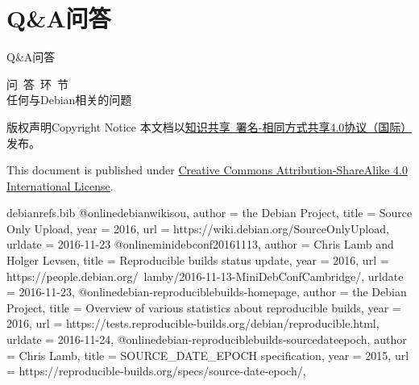 \documentclass[aspectratio=169]{beamer}
\begin{document}

\section{Q\&A问答}

\begin{frame}{Q\&A}{问答}
\begin{center}
{\Large 问~答~环~节}
\\
任何与Debian相关的问题
\end{center}
\end{frame}

\begin{frame}{版权声明}{Copyright Notice}
本文档以\href{https://creativecommons.org/licenses/by-sa/4.0/legalcode}{知识共享~署名-相同方式共享4.0协议（国际）}发布。
\vspace{1em}

This document is published under \href{https://creativecommons.org/licenses/by-sa/4.0/legalcode}{Creative Commons Attribution-ShareAlike 4.0 International License}.
\end{frame}

\begin{filecontents*}{debianrefs.bib}
@online{debianwikisou,
  author = {the Debian Project},
  title = {Source Only Upload},
  year = 2016,
  url = {https://wiki.debian.org/SourceOnlyUpload},
  urldate = {2016-11-23}
}
@online{minidebconf20161113,
  author = {Chris Lamb and
            Holger Levsen},
  title = {Reproducible builds status update},
  year = 2016,
  url = {https://people.debian.org/~lamby/2016-11-13-MiniDebConfCambridge/},
  urldate = {2016-11-23},
}
@online{debian-reproduciblebuilds-homepage,
  author = {the Debian Project},
  title = {Overview of various statistics about reproducible builds},
  year = 2016,
  url = {https://tests.reproducible-builds.org/debian/reproducible.html},
  urldate = {2016-11-24},
}
@online{debian-reproduciblebuilds-sourcedateepoch,
  author = {Chris Lamb},
  title = {SOURCE\_DATE\_EPOCH specification},
  year = 2015,
  url = {https://reproducible-builds.org/specs/source-date-epoch/},
}
\end{filecontents*}

\end{document}
